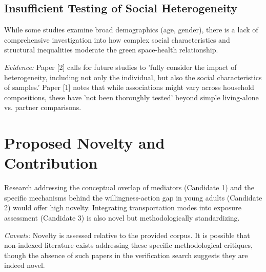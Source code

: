 \documentclass[conference]{IEEEtran}
\begin{document}
\subsection{Insufficient Testing of Social Heterogeneity}
While some studies examine broad demographics (age, gender), there is a lack of comprehensive investigation into how complex social characteristics and structural inequalities moderate the green space-health relationship.

\textit{Evidence:} Paper [2] calls for future studies to 'fully consider the impact of heterogeneity, including not only the individual, but also the social characteristics of samples.' Paper [1] notes that while associations might vary across household compositions, these have 'not been thoroughly tested' beyond simple living-alone vs. partner comparisons.

\section{Proposed Novelty and Contribution}
Research addressing the conceptual overlap of mediators (Candidate 1) and the specific mechanisms behind the willingness-action gap in young adults (Candidate 2) would offer high novelty. Integrating transportation modes into exposure assessment (Candidate 3) is also novel but methodologically standardizing.

\textit{Caveats:} Novelty is assessed relative to the provided corpus. It is possible that non-indexed literature exists addressing these specific methodological critiques, though the absence of such papers in the verification search suggests they are indeed novel.
\end{document}
